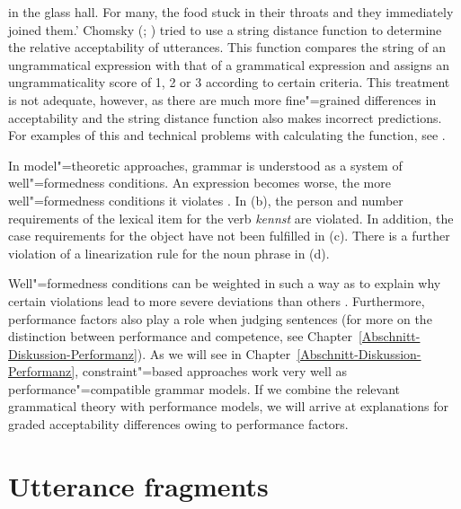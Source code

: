 in the glass hall. For many, the food stuck in their throats and they immediately joined them.'
\z
Chomsky (\citeyear[Chapter~5]{Chomsky75a}; \citeyear{Chomsky64a}) tried to use a string distance function to determine the relative
acceptability of utterances. This function compares the string of an ungrammatical expression with that of a grammatical expression
and assigns an ungrammaticality score of 1, 2 or 3 according to certain criteria. This treatment is not adequate, however, as there
are much more fine"=grained differences in acceptability and the string distance function also makes incorrect predictions.
For examples of this and technical problems with calculating the function, see .

In model"=theoretic approaches, grammar is understood as a system of well"=formedness conditions. An expression becomes worse, the
more well"=formedness conditions it violates \citep[--27]{PS2001a}. In (b), the person and number requirements of
the lexical item for the verb \emph{kennst} are violated. In addition, the case requirements for the object have not been fulfilled in
(c). There is a further violation of a linearization rule for the noun phrase in (d).

Well"=formedness conditions can be weighted in such a way as to explain why certain violations lead to more severe deviations than
others \citep{SK2005a}. Furthermore, performance factors also play a role when judging sentences (for more on the distinction between performance
and competence, see Chapter~\ref{Abschnitt-Diskussion-Performanz}). As we will see in Chapter~\ref{Abschnitt-Diskussion-Performanz},
constraint"=based approaches work very well as performance"=compatible grammar models. If we combine the relevant grammatical theory
with performance models, we will arrive at explanations for graded acceptability differences owing to performance factors.

\section{Utterance fragments}

